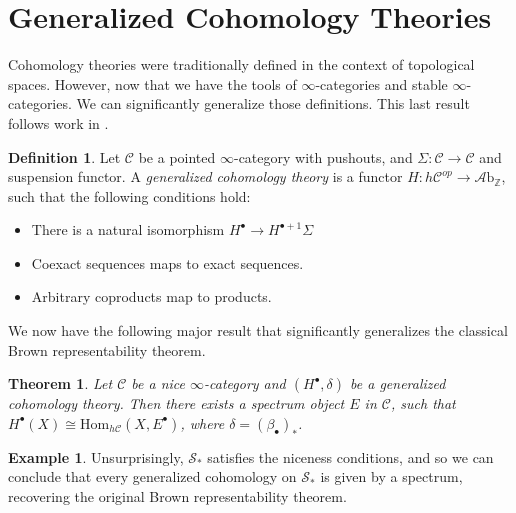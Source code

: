 \documentclass[10pt]{amsart}
\newcommand{\C}{\mathscr{C}}
\newcommand{\s}{\mathscr{S}}
\newcommand{\bZ}{\mathbb{Z}}
\newcommand{\Ab}{\mathscr{A}\mathrm{b}}
\newcommand{\Hom}{\mathrm{Hom}}
\newtheorem{theorem}[equation]{Theorem}
\theoremstyle{definition}
\newtheorem{definition}[equation]{Definition}
\newtheorem{example}[equation]{Example}
\theoremstyle{remark}
\begin{document}
\section{Generalized Cohomology Theories}
Cohomology theories were traditionally defined in the context of topological spaces. However, now that we have the tools of $\infty$-categories and stable $\infty$-categories. We can significantly generalize those definitions. This last result follows work in \cite{lurie2017ha}.
\begin{definition}
  Let $\C$ be a pointed $\infty$-category with pushouts, and $\Sigma\colon\C \to \C$ and suspension functor. A \emph{generalized cohomology theory} is a functor $H \colon h\C^{op}\to \Ab_\bZ$, such that the following conditions hold:
  \begin{itemize}
    \item There is a natural isomorphism $H^\bullet \to H^{\bullet +1} \Sigma$ 
    \item Coexact sequences maps to exact sequences. 
    \item Arbitrary coproducts map to products.
  \end{itemize}
\end{definition}

We now have the following major result that significantly generalizes the classical Brown representability theorem.
\begin{theorem}
 Let $\C$ be a nice $\infty$-category and $(H^\bullet,\delta)$ be a generalized cohomology theory. Then there exists a spectrum object $E$ in $\C$, such that $H^\bullet(X) \cong \Hom_{h\C}(X,E^\bullet)$, where $\delta = (\beta_\bullet)_*$.
\end{theorem}

\begin{example}
  Unsurprisingly, $\s_*$ satisfies the niceness conditions, and so we can conclude that every generalized cohomology on $\s_*$ is given by a spectrum, recovering the original Brown representability theorem.
\end{example}


{\footnotesize


}
\end{document}
